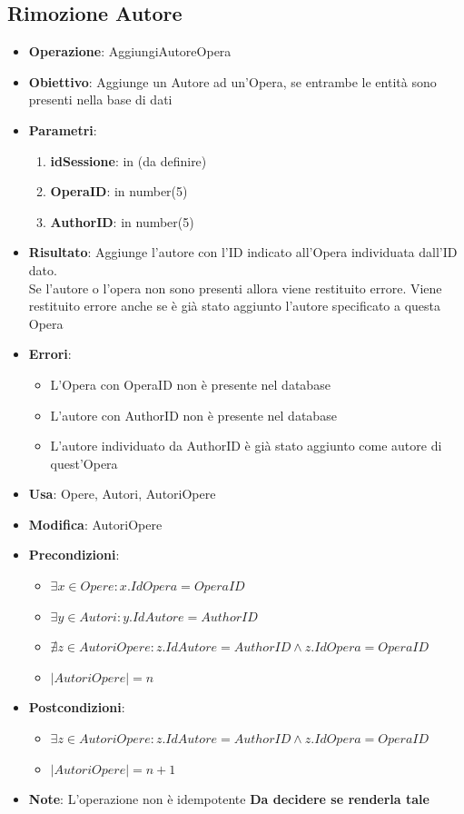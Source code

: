 \documentclass[a4paper,11pt]{article}
\begin{document}
\subsection{Rimozione Autore}
\begin{itemize}
	\item \textbf{Operazione}: AggiungiAutoreOpera
	\item \textbf{Obiettivo}: Aggiunge un Autore ad un'Opera, se entrambe le entità sono presenti nella base di dati
	\item \textbf{Parametri}:
	\begin{enumerate}
		\item \textbf{idSessione}: in (da definire)
		\item \textbf{OperaID}: in number(5)
		\item \textbf{AuthorID}: in number(5)
	\end{enumerate}
	\item \textbf{Risultato}: Aggiunge l'autore con l'ID indicato all'Opera individuata dall'ID dato.\\
	Se l'autore o l'opera non sono presenti allora viene restituito errore.	Viene restituito errore anche se è già stato aggiunto l'autore specificato a questa Opera
	\item \textbf{Errori}: 
	\begin{itemize}
		\item L'Opera con OperaID non è presente nel database
		\item L'autore con AuthorID non è presente nel database
		\item L'autore individuato da AuthorID è già stato aggiunto come autore di quest'Opera
	\end{itemize}
	\item \textbf{Usa}: Opere, Autori, AutoriOpere
	\item \textbf{Modifica}: AutoriOpere
	\item \textbf{Precondizioni}:
	\begin{itemize}
		\item $\exists x \in Opere : x.IdOpera = OperaID$
		\item $\exists y \in Autori : y.IdAutore = AuthorID$
		\item $\nexists z \in AutoriOpere : z.IdAutore = AuthorID \land z.IdOpera = OperaID$
		\item $|AutoriOpere| = n$
	\end{itemize}
	\item \textbf{Postcondizioni}:
	\begin{itemize}
		\item $\exists z \in AutoriOpere : z.IdAutore = AuthorID \land z.IdOpera = OperaID$
		\item $|AutoriOpere| = n + 1$
	\end{itemize}
	\item \textbf{Note}: L'operazione non è idempotente \textbf{\color{red} Da decidere se renderla tale}
\end{itemize}
\end{document}

